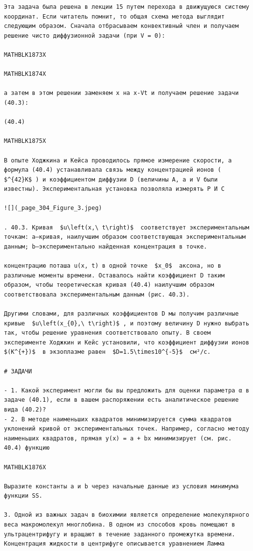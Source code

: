 \documentclass[
]{article}
\begin{document}
\begin{verbatim}
Эта задача была решена в лекции 15 путем перехода в движущуюся систему координат. Если читатель помнит, то общая схема метода выглядит следующим образом. Сначала отбрасываем конвективный член и получаем решение чисто диффузионной задачи (при V = 0):

MATHBLK1873X

MATHBLK1874X

а затем в этом решении заменяем x на x-Vt и получаем решение задачи (40.3):

(40.4) 

MATHBLK1875X

В опыте Ходжкина и Кейса проводилось прямое измерение скорости, а формула (40.4) устанавливала связь между концентрацией ионов ( $^{42}K$ ) и коэффициентом диффузии D (величины A, a и V были известны). Экспериментальная установка позволяла измерять Р И С

![](_page_304_Figure_3.jpeg)

. 40.3. Кривая  $u\left(x,\ t\right)$  соответствует экспериментальным точкам: a—кривая, наилучшим образом соответствующая экспериментальным данным; b—экспериментально найденная концентрация в точке.

концентрацию поташа u(x, t) в одной точке  $x_0$  аксона, но в различные моменты времени. Оставалось найти коэффициент D таким образом, чтобы теоретическая кривая (40.4) наилучшим образом соответствовала экспериментальным данным (рис. 40.3).

Другими словами, для различных коэффициентов D мы получим различные кривые  $u\left(x_{0},\ t\right)$ , и поэтому величину D нужно выбрать так, чтобы решение уравнения соответствовало опыту. В своем эксперименте Ходжкин и Кейс установили, что коэффициент диффузии ионов  $(K^{+})$  в экзоплазме равен  $D=1.5\times10^{-5}$  см²/с.

# ЗАДАЧИ

- 1. Какой эксперимент могли бы вы предложить для оценки параметра α в задаче (40.1), если в вашем распоряжении есть аналитическое решение вида (40.2)?
- 2. В методе наименьших квадратов минимизируется сумма квадратов уклонений кривой от экспериментальных точек. Например, согласно методу наименьших квадратов, прямая y(x) = a + bx минимизирует (см. рис. 40.4) функцию

MATHBLK1876X

Выразите константы a и b через начальные данные из условия минимума функции SS.

3. Одной из важных задач в биохимии является определение молекулярного веса макромолекул многлобина. В одном из способов кровь помещают в ультрацентрифугу и вращают в течение заданного промежутка времени. Концентрация жидкости в центрифуге описывается уравнением Ламма


\end{verbatim}
\end{document}
